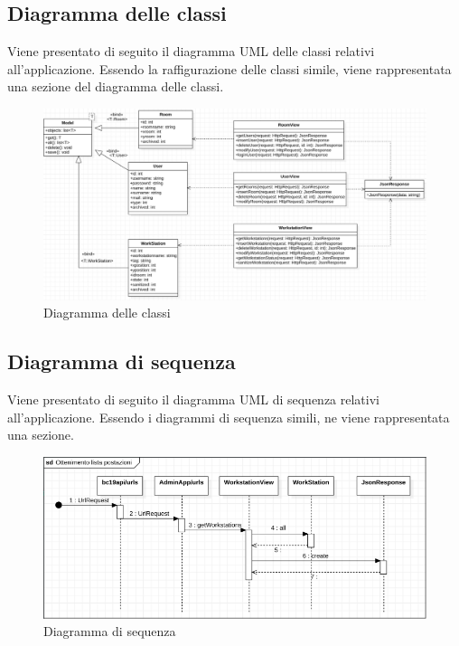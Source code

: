 \subsection{Diagramma delle classi}
Viene presentato di seguito il diagramma UML delle classi relativi all'applicazione. Essendo la raffigurazione delle classi simile, viene rappresentata una sezione del diagramma delle classi.
\begin{figure}[H]
	\centering
	\includegraphics[width=16cm]{res/images/beclassi.png}
	\caption{Diagramma delle classi}
	\label{fig:Diagramma delle classi}
\end{figure}
\subsection{Diagramma di sequenza}
Viene presentato di seguito il diagramma UML di sequenza relativi all'applicazione. Essendo i diagrammi di sequenza simili, ne viene rappresentata una sezione.
\begin{figure}[H]
	\centering
	\includegraphics[width=16cm]{res/images/besequenza.png}
	\caption{Diagramma di sequenza}
	\label{fig:Diagramma di sequenza}
\end{figure}